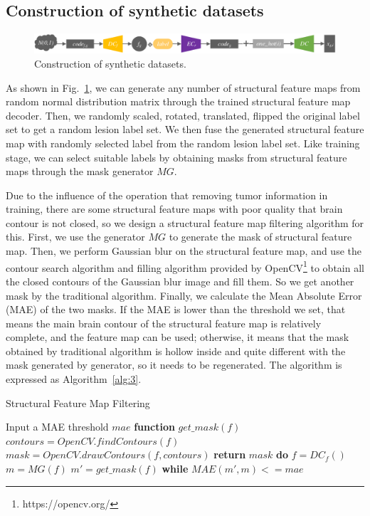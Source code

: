 \documentclass{ecai}
\begin{document}
\subsection{Construction of synthetic datasets}
\label{make dataset}
\begin{figure}
	\centering
	\includegraphics[width=0.98\columnwidth]{figures/make_data}
	\caption{Construction of synthetic datasets.}
	\label{make_data}
\end{figure}
As shown in Fig.~\ref{make_data}, we can generate any number of structural feature maps from random normal distribution matrix through the trained structural feature map decoder. Then, we randomly scaled, rotated, translated, flipped the original label set to get a random lesion label set. We then fuse the generated structural feature map with randomly selected label from the random lesion label set. Like training stage, we can select suitable labels by obtaining masks from structural feature maps through the mask generator $MG$.

Due to the influence of the operation that removing tumor information in training, there are some structural feature maps with poor quality that brain contour is not closed, so we design a structural feature map filtering algorithm for this. First, we use the generator $MG$ to generate the mask of structural feature map. Then, we perform Gaussian blur\cite{92wink2004denoising} on the structural feature map, and use the contour search algorithm and filling algorithm provided by OpenCV\footnote{https://opencv.org/} to obtain all the closed contours of the Gaussian blur image and fill them. So we get another mask by the traditional algorithm. Finally, we calculate the Mean Absolute Error (MAE) of the two masks. If the MAE is lower than the threshold we set, that means the main brain contour of the structural feature map is relatively complete, and the feature map can be used; otherwise, it means that the mask obtained by traditional algorithm is hollow inside and quite different with the mask generated by generator, so it needs to be regenerated. The algorithm is expressed as Algorithm~\ref{alg:3}.
\begin{algorithm}
	\caption{Structural Feature Map Filtering}
	\label{alg:3}
	\begin{algorithmic}[1]
		\State Input a MAE threshold $mae$
		\State \textbf{function} $get\_mask(f)$
		\State \indent$contours = OpenCV.findContours(f)$
		\State \indent$mask =OpenCV.drawContours(f,contours)$
		\State \indent\textbf{return} $mask$
		\State \textbf{do} 
		\State \indent$f = DC_f()$
		\State \indent$m = MG(f)$
		\State \indent$m'= get\_mask(f)$
		\State \textbf{while} $MAE(m',m) <= mae$
	\end{algorithmic}  
\end{algorithm}
\end{document}
